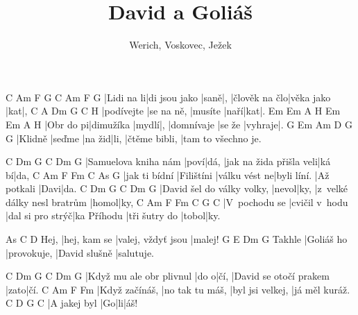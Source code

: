 \documentclass{song}
\title{David a Goliáš}
\author{Werich, Voskovec, Ježek}
\begin{document}
\strophe
C          Am            F    G\7 C             Am         F   G\7
|Lidi na li|di jsou jako |saně|,  |člověk na člo|věka jako |kat|,
C          A          Dm      G\7  C   H\7
|podívejte |se na ně, |musíte |naří|kat|.
Em        Em\6      A     H\7 Em         Em\6   A       H\7
|Obr do pi|dimužíka |mydlí|,  |domnívaje |se že |vyhraje|.
G       Em     Am     D\7  G             G\7
|Klidně |seďme |na žid|li, |čtěme bibli, |tam to všechno je.
\endstrophe

\strophe
C                    Dm   G\7  C                       Dm    G\7
|Samuelova kniha nám |poví|dá, |jak na žida přišla veli|ká bí|da,
C             Am         F             Fm          C           As\7 G\7
|jak ti bídní |Filištíni |válku vést ne|byli líní. |Až potkali |Davi|da.
C                          Dm    G\7  C                           Dm    G\7
|David šel do války volky, |nevol|ky, |z~velké dálky nesl bratrům |homol|ky,
C             Am             F                Fm          C             G\7   C
|V~pochodu se |cvičil v~hodu |dal si pro strýč|ka Příhodu |tři šutry do |tobol|ky.
\endstrophe

\strophe
     As           C                  D\7
Hej, |hej, kam se |valej, vždyť jsou |malej!
       G\7        E\7         Dm\7          G\7
Takhle |Goliáš ho |provokuje, |David slušně |salutuje.
\endstrophe

\strophe
C                        Dm   G\7  C                      Dm   G\7
|Když mu ale obr plivnul |do o|čí, |David se otočí prakem |zato|čí.
C              Am              F                Fm
|Když začínáš, |no tak tu máš, |byl jsi velkej, |já měl kuráž.
C            D\7 G\7 C
|A jakej byl |Go|li|áš!
\endstrophe

\end{document}
